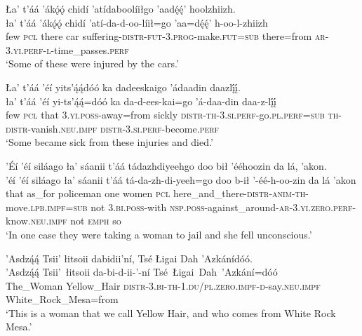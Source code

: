 \ea\label{ex:text7-14-2}
Ła’ t’áá ’ákǫ́ǫ́ chidí ’atídaboolíiłgo ’aadę́ę́’ hoolzhiizh.\\
\gll ła’	t’áá	’ákǫ́ǫ́	chidí	’atí-da-d-oo-líił=go	’aa=dę́ę́’	h-oo-l-zhiizh\\
     few	\textsc{pcl}	there	car	suffering-\textsc{distr}-\textsc{fut}-3.\textsc{prog}-make.\textsc{fut}=\textsc{sub}	there=from	\textsc{ar}-3.\textsc{yi}.\textsc{perf}-\textsc{l}-time\_passes.\textsc{perf}\\
\glt `Some of these were injured by the cars.'
\z

\ea\label{ex:text7-14-3}
Ła’ t’áá ’éí yits’ą́ą́dóó ka dadeeskaigo ’ádaadin daazlį́į́.\\
\gll ła’	t’áá ’éí	yi-ts’ą́ą́=dóó	ka	da-d-ees-kai=go	’á-daa-din	daa-z-lį́į́\\
     few	\textsc{pcl} that	3.\textsc{yi}.\textsc{poss}-away=from	sickly	\textsc{distr}-\textsc{th}-3.\textsc{si}.\textsc{perf}-go.\textsc{pl}.\textsc{perf}=\textsc{sub}	\textsc{th}-\textsc{distr}-vanish.\textsc{neu}.\textsc{impf}	\textsc{distr}-3.\textsc{si}.\textsc{perf}-become.\textsc{perf}\\
\glt `Some became sick from these injuries and died.'
\z

\ea\label{ex:text7-14-4}
’Éí ’éí siláago ła’ sáanii t’áá tádazhdiyeehgo doo bił ’ééhoozin da lá, ’akon.\\
\gll ’éí	’éí	siláago	ła’	sáanii	t’áá	tá-da-zh-di-yeeh=go	doo	b-ił	’-éé-h-oo-zin	da	lá	’akon\\
     that	as\_for	policeman	one	women	\textsc{pcl}	here\_and\_there-\textsc{distr}-\textsc{anim}-\textsc{th}-move.\textsc{lpb}.\textsc{impf}=\textsc{sub}	not	3.\textsc{bi}.\textsc{poss}-with	\textsc{nsp}.\textsc{poss}-against\_around-\textsc{ar}-3.\textsc{yi}.\textsc{zero}.\textsc{perf}-know.\textsc{neu}.\textsc{impf}	not	\textsc{emph}	so\\
\glt `In one case they were taking a woman to jail and she fell unconscious.'
\z

\ea\label{ex:text7-14-5}
’Asdzą́ą́ Tsii’ łitsoii dabidii’ní, Tsé Łigai Dah ’Azkánídóó.\\
\gll ’Asdzą́ą́	Tsii’~{łitsoii}	da-bi-d-ii-’-ní	Tsé~Łigai~Dah~{’Azkání=dóó}\\
     The\_Woman	Yellow\_Hair	\textsc{distr}-3.\textsc{bi}-\textsc{th}-1.\textsc{du}/\textsc{pl}.\textsc{zero}.\textsc{impf}-\textsc{d}-say.\textsc{neu}.\textsc{impf}	White\_Rock\_Mesa=from\\
\glt `This is a woman that we call Yellow Hair, and who comes from White Rock Mesa.'
\z

